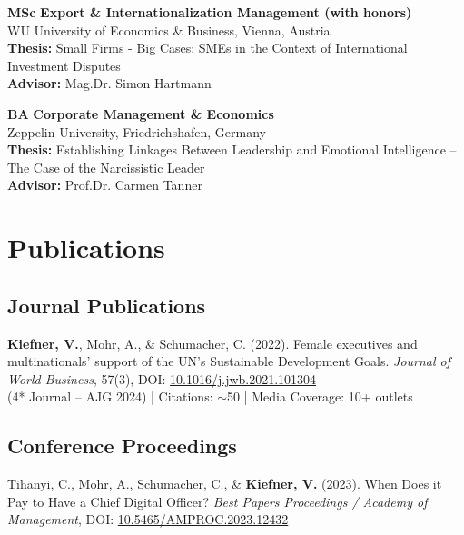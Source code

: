 \documentclass[11pt,a4paper]{article}
\begin{document}
\begin{cv}
\begin{cvlist}{}
  \item[09/2018--08/2020] 
      \textbf{MSc} {{\textbf{Export \& Internationalization Management (with honors)}}}\\
      WU University of Economics \& Business, Vienna, Austria\\
      \textbf{Thesis:} Small Firms - Big Cases: SMEs in the Context of International Investment Disputes\\
      \textbf{Advisor:} {Mag.Dr. Simon Hartmann}
      
  \item[03/2013--03/2017] 
      \textbf{BA} {{\textbf{Corporate Management \& Economics}}}\\
      Zeppelin University, Friedrichshafen, Germany\\
      \textbf{Thesis:} Establishing Linkages Between Leadership and Emotional Intelligence -- The Case of the Narcissistic Leader\\
      \textbf{Advisor:} {Prof.Dr. Carmen Tanner}
\end{cvlist}

\section{Publications}

\subsection{Journal Publications}
\begin{cvlist}{}
    \item[2022]
      \textbf{Kiefner, V.}, Mohr, A., \& Schumacher, C. (2022). 
      Female executives and multinationals' support of the UN's Sustainable Development Goals. 
      \textit{Journal of World Business}, 57(3), DOI: \href{https://doi.org/10.1016/j.jwb.2021.101304}{10.1016/j.jwb.2021.101304}\\
      (4* Journal -- AJG 2024) | Citations: $\sim$50 | Media Coverage: 10+ outlets
\end{cvlist}

\subsection{Conference Proceedings}
\begin{cvlist}{}
    \item[2023]
      Tihanyi, C., Mohr, A., Schumacher, C., \& \textbf{Kiefner, V.} (2023). 
      When Does it Pay to Have a Chief Digital Officer? 
      \textit{Best Papers Proceedings / Academy of Management}, DOI: \href{https://doi.org/10.5465/AMPROC.2023.12432}{10.5465/AMPROC.2023.12432}\\
\end{cvlist}


\end{cv}
\end{document}
